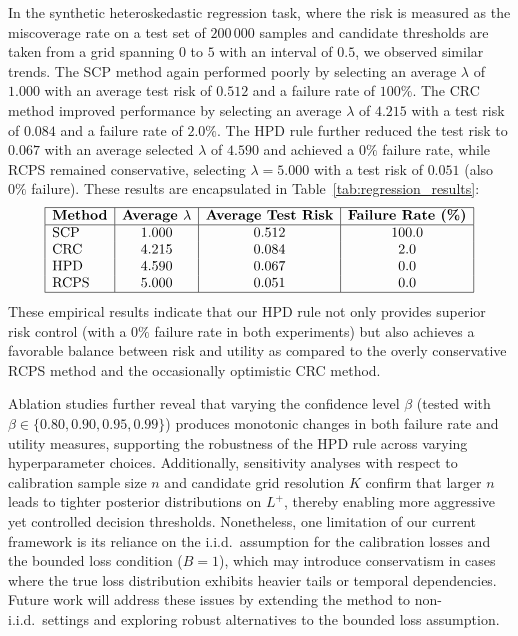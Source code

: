 \documentclass{article}
\begin{document}
In the synthetic heteroskedastic regression task, where the risk is measured as the miscoverage rate on a test set of \(200\,000\) samples and candidate thresholds are taken from a grid spanning \(0\) to \(5\) with an interval of \(0.5\), we observed similar trends. The SCP method again performed poorly by selecting an average \(\lambda\) of \(1.000\) with an average test risk of \(0.512\) and a failure rate of \(100\%\). The CRC method improved performance by selecting an average \(\lambda\) of \(4.215\) with a test risk of \(0.084\) and a failure rate of \(2.0\%\). The HPD rule further reduced the test risk to \(0.067\) with an average selected \(\lambda\) of \(4.590\) and achieved a \(0\%\) failure rate, while RCPS remained conservative, selecting \(\lambda = 5.000\) with a test risk of \(0.051\) (also \(0\%\) failure). These results are encapsulated in Table~\ref{tab:regression_results}:
\[
\begin{array}{|l|c|c|c|}
\hline
\textbf{Method} & \textbf{Average } \lambda & \textbf{Average Test Risk} & \textbf{Failure Rate (\%)} \\
\hline
\text{SCP} & 1.000 & 0.512 & 100.0 \\
\text{CRC} & 4.215 & 0.084 & 2.0 \\
\text{HPD} & 4.590 & 0.067 & 0.0 \\
\text{RCPS} & 5.000 & 0.051 & 0.0 \\
\hline
\end{array}
\]
These empirical results indicate that our HPD rule not only provides superior risk control (with a \(0\%\) failure rate in both experiments) but also achieves a favorable balance between risk and utility as compared to the overly conservative RCPS method and the occasionally optimistic CRC method.

Ablation studies further reveal that varying the confidence level \(\beta\) (tested with \(\beta \in \{0.80, 0.90, 0.95, 0.99\}\)) produces monotonic changes in both failure rate and utility measures, supporting the robustness of the HPD rule across varying hyperparameter choices. Additionally, sensitivity analyses with respect to calibration sample size \(n\) and candidate grid resolution \(K\) confirm that larger \(n\) leads to tighter posterior distributions on \(L^+\), thereby enabling more aggressive yet controlled decision thresholds. Nonetheless, one limitation of our current framework is its reliance on the i.i.d.\ assumption for the calibration losses and the bounded loss condition (\(B=1\)), which may introduce conservatism in cases where the true loss distribution exhibits heavier tails or temporal dependencies. Future work will address these issues by extending the method to non-i.i.d.\ settings and exploring robust alternatives to the bounded loss assumption.
\end{document}
